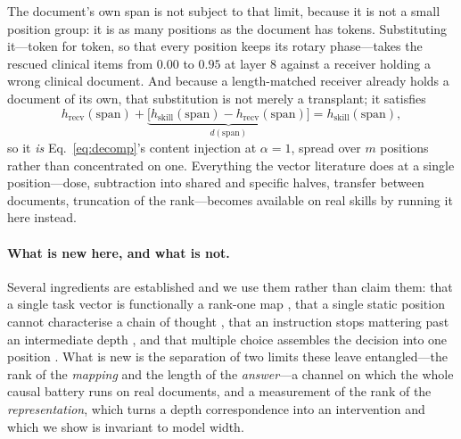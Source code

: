 \documentclass{article}
\newcommand{\dvec}{\ensuremath{d}}
\begin{document}
The document's own span is not subject to that limit, because it is not a small
position group: it is as many positions as the document has tokens.
Substituting it---token for token, so that every position keeps its rotary
phase---takes the rescued clinical items from $0.00$ to $0.95$ at layer $8$
against a receiver holding a wrong clinical document. And because a
length-matched receiver already holds a document of its own, that substitution
is not merely a transplant; it satisfies
\begin{equation}
h_{\text{recv}}(\text{span}) + \underbrace{\bigl[h_{\text{skill}}(\text{span})
- h_{\text{recv}}(\text{span})\bigr]}_{\dvec(\text{span})}
= h_{\text{skill}}(\text{span}),
\end{equation}
so it \emph{is} Eq.~\ref{eq:decomp}'s content injection at $\alpha = 1$, spread
over $m$ positions rather than concentrated on one. Everything the vector
literature does at a single position---dose, subtraction into shared and
specific halves, transfer between documents, truncation of the rank---becomes
available on real skills by running it here instead.

\paragraph{What is new here, and what is not.} Several ingredients are
established and we use them rather than claim them: that a single task vector is
functionally a rank-one map \citep{dong2026taskvectorlimits}, that a single
static position cannot characterise a chain of thought
\citep{dura2026sequentialpatching}, that an instruction stops mattering past an
intermediate depth \citep{onset2025instruction}, and that multiple choice
assembles the decision into one position \citep{wiegreffe2025mcq}. What is new
is the separation of two limits these leave entangled---the rank of the
\emph{mapping} and the length of the \emph{answer}---a channel on which the
whole causal battery runs on real documents, and a measurement of the rank of
the \emph{representation}, which turns a depth correspondence into an
intervention and which we show is invariant to model width.




\begin{table}[h]
\caption{Participation ratio of the document's span on Qwen3-8B, measured four
ways, medians over $36$ items (the plain column is bimodal, so its mean
describes no item). The first column is the quantity usually reported and the
only one that collapses. The last two columns say why: at layer $16$ one token
in $34$ of $40$ documents acquires a state $150$ times (median) the span's norm, carried by
two fixed hidden dimensions, and the top eight dimensions then hold $98\%$ of
the variance. Removing four positions out of four hundred, or normalising each
position to unit length, removes the collapse entirely.}
\label{tab:prdiag}
\centering
\small
\setlength{\tabcolsep}{4pt}

\end{table}
\end{document}
